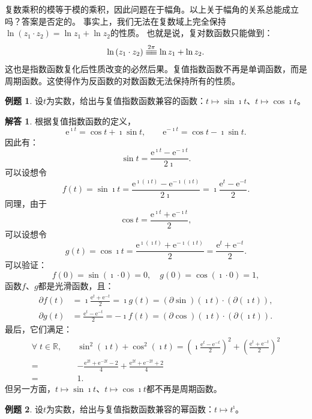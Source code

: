 \documentclass[12pt,UTF8]{ctexbook}
\newcommand{\e}{\mathrm{e}}
\newcommand{\tong}[1]{\overset{#1}{\equiv\joinrel\equiv}}
\theoremstyle{definition}
\newtheorem{et}{例题}[section]
\newtheorem*{so}{解答}
\theoremstyle{plain}
\begin{document}
复数乘积的模等于模的乘积，因此问题在于幅角。以上关于幅角的关系总能成立吗？答案是否定的。
事实上，我们无法在复数域上完全保持$\ln{(z_1 \cdot z_2)} = \ln{z_1} + \ln{z_2}$的性质。
也就是说，复对数函数只能做到：
$$ \ln{(z_1 \cdot z_2)} \tong{2\pi} \ln{z_1} + \ln{z_2} . $$
这也是指数函数复化后性质改变的必然后果。复值指数函数不再是单调函数，而是周期函数。这使得作为反函数的对数函数无法保持所有的性质。

\begin{et}
    设$t$为实数，给出与复值指数函数兼容的函数：$t\mapsto \sin{\imath t}$、$t\mapsto \cos{\imath t}$。
\end{et}

\begin{so}
    根据复值指数函数的定义，
    $$ \e^{\imath t} = \cos{t} + \imath \sin{t}, \qquad \e^{-\imath t} = \cos{t} - \imath \sin{t}. $$
    因此有：
    $$ \sin{t} = \frac{\e^{\imath t} - \e^{-\imath t}}{2\imath}.$$
    可以设想令
    $$ f(t) = \sin{\imath t} = \frac{\e^{\imath (\imath t)} - \e^{-\imath (\imath t)}}{2\imath} = \imath \frac{\e^{t} - \e^{-t}}{2}.$$
    同理，由于
    $$ \cos{t} = \frac{\e^{\imath t} + \e^{-\imath t}}{2},$$
    可以设想令
    $$ g(t) = \cos{\imath t} = \frac{\e^{\imath (\imath t)} + \e^{-\imath (\imath t)}}{2} = \frac{\e^{t} + \e^{-t}}{2}.$$
    可以验证：
    $$ f(0) = \sin{(\imath \cdot 0)} = 0, \quad g(0)=\cos{(\imath \cdot 0)} = 1,$$
    函数$f$、$g$都是光滑函数，且：
    \begin{align*}
        \partial f(t) &= \imath \frac{\e^{t} + \e^{-t}}{2} = \imath g(t) = (\partial\sin)(\imath t)\cdot (\partial(\imath t)), \\
        \partial g(t) &= \frac{\e^{t} - \e^{-t}}{2} = -\imath f(t) = (\partial\cos)(\imath t)\cdot (\partial(\imath t)).
    \end{align*}
    最后，它们满足：
    \begin{align*}
        \forall \; t\in \mathbb{R}, \quad & \sin^2{(\imath t)} + \cos^2{(\imath t)} = \left(\imath \frac{\e^{t} - \e^{-t}}{2}\right)^2 + \left( \frac{\e^{t} + \e^{-t}}{2}\right)^2 \\
        =\;& -\frac{\e^{2t} + \e^{-2t} - 2}{4} + \frac{\e^{2t} + \e^{-2t} + 2}{4} \\
        =\;& 1.
    \end{align*}
    但另一方面，$t\mapsto \sin{\imath t}$、$t\mapsto \cos{\imath t}$都不再是周期函数。

\end{so}

\begin{et}
    设$t$为实数，给出与复值指数函数兼容的幂函数：$t\mapsto t^{\imath}$。
\end{et}
\end{document}
